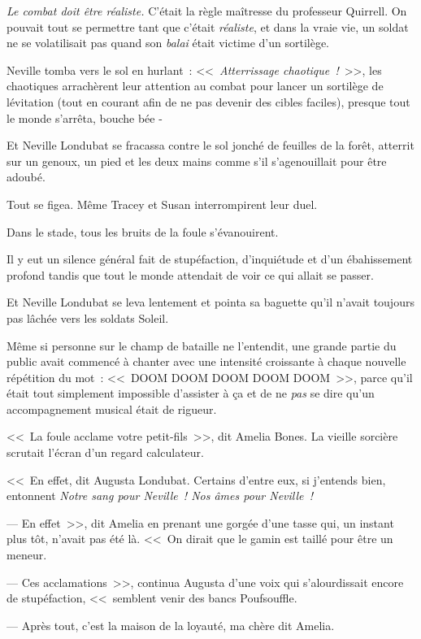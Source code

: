 \emph{Le combat doit être réaliste.} C'était la règle maîtresse du professeur Quirrell. On pouvait tout se permettre tant que c'était \emph{réaliste}, et dans la vraie vie, un soldat ne se volatilisait pas quand son \emph{balai} était victime d'un sortilège.

Neville tomba vers le sol en hurlant~: <<~\emph{Atterrissage chaotique~!}~>>, les chaotiques arrachèrent leur attention au combat pour lancer un sortilège de lévitation (tout en courant afin de ne pas devenir des cibles faciles), presque tout le monde s'arrêta, bouche bée -

Et Neville Londubat se fracassa contre le sol jonché de feuilles de la forêt, atterrit sur un genoux, un pied et les deux mains comme s'il s'agenouillait pour être adoubé.

Tout se figea. Même Tracey et Susan interrompirent leur duel.

Dans le stade, tous les bruits de la foule s'évanouirent.

Il y eut un silence général fait de stupéfaction, d'inquiétude et d'un ébahissement profond tandis que tout le monde attendait de voir ce qui allait se passer.

Et Neville Londubat se leva lentement et pointa sa baguette qu'il n'avait toujours pas lâchée vers les soldats Soleil.

Même si personne sur le champ de bataille ne l'entendit, une grande partie du public avait commencé à chanter avec une intensité croissante à chaque nouvelle répétition du mot~: <<~DOOM DOOM DOOM DOOM DOOM~>>, parce qu'il était tout simplement impossible d'assister à ça et de ne \emph{pas} se dire qu'un accompagnement musical était de rigueur.

<<~La foule acclame votre petit-fils~>>, dit Amelia Bones. La vieille sorcière scrutait l'écran d'un regard calculateur.

<<~En effet, dit Augusta Londubat. Certains d'entre eux, si j'entends bien, entonnent \emph{Notre sang pour Neville~! Nos âmes pour Neville~!}

--- En effet~>>, dit Amelia en prenant une gorgée d'une tasse qui, un instant plus tôt, n'avait pas été là. <<~On dirait que le gamin est taillé pour être un meneur.

--- Ces acclamations~>>, continua Augusta d'une voix qui s'alourdissait encore de stupéfaction, <<~semblent venir des bancs Poufsouffle.

--- Après tout, c'est la maison de la loyauté, ma chère dit Amelia.

